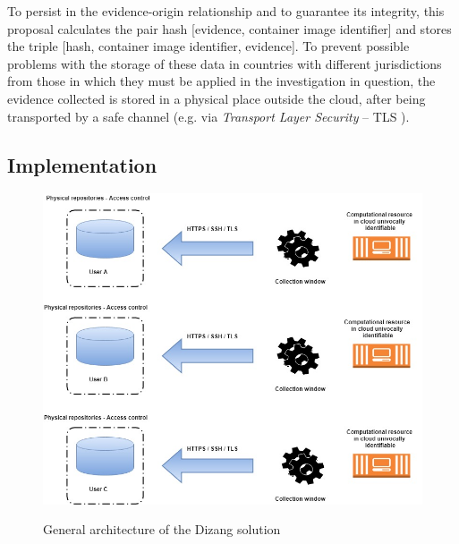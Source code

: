 \documentclass[conference]{IEEEtran}
\newcommand{\fancyname}{Dizang }
\begin{document}
To persist in the evidence-origin relationship and to guarantee its integrity, this proposal calculates the pair hash [evidence, container image identifier] and stores the triple [hash, container image identifier, evidence].
%
To prevent possible problems with the storage of these data in countries with different jurisdictions from those in which they must be applied in the investigation in question, the evidence collected is stored in a physical place outside the cloud, after being transported by a safe channel (e.g. via \textit{Transport Layer Security} – TLS \cite{DierksT2008}).
%

\subsection{Implementation}
\label{sec:proposal-impl}

\begin{figure}[htb!]
\footnotesize
\caption{General architecture of the \fancyname solution}
\includegraphics[scale=0.31]{solucao-eng.jpg}
\centering
\label{fig:Solucao}
\end{figure}
\end{document}
